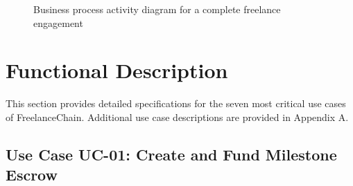 \begin{figure}[H]
    \centering
    \caption{Business process activity diagram for a complete freelance engagement}
    \label{fig:business_process}
\end{figure}

\section{Functional Description}
\label{section:2.3}

This section provides detailed specifications for the seven most critical use cases of FreelanceChain. Additional use case descriptions are provided in Appendix A.

\subsection{Use Case UC-01: Create and Fund Milestone Escrow}
\label{subsection:uc01}

